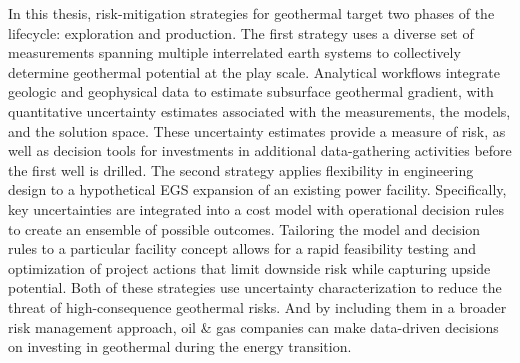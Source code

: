 In this thesis, risk-mitigation strategies for geothermal target two phases of the lifecycle: exploration and production. The first strategy uses a diverse set of measurements spanning multiple interrelated earth systems to collectively determine geothermal potential at the play scale. Analytical workflows integrate geologic and geophysical data to estimate subsurface geothermal gradient, with quantitative uncertainty estimates associated with the measurements, the models, and the solution space. These uncertainty estimates provide a measure of risk, as well as decision tools for investments in additional data-gathering activities before the first well is drilled. The second strategy applies flexibility in engineering design to a hypothetical EGS expansion of an existing power facility. Specifically, key uncertainties are integrated into a cost model with operational decision rules to create an ensemble of possible outcomes. Tailoring the model and decision rules to a particular facility concept allows for a rapid feasibility testing and optimization of project actions that limit downside risk while capturing upside potential. Both of these strategies use uncertainty characterization to reduce the threat of high-consequence geothermal risks. And by including them in a broader risk management approach, oil \& gas companies can make data-driven decisions on investing in geothermal during the energy transition.